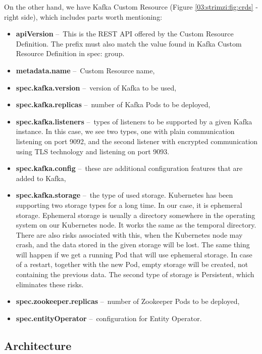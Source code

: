 On the other hand, we have Kafka Custom Resource (Figure \ref{03:strimzi:fig:crds} - right side), which includes parts worth mentioning:
\begin{itemize}[itemsep=1mm, parsep=0pt]
  \item \textbf{apiVersion} \---\ This is the REST API offered by the Custom Resource Definition. The prefix must also match the value found in Kafka Custom Resource Definition in spec: group. 
  \item \textbf{metadata.name} \---\ Custom Resource name,
  \item \textbf{spec.kafka.version} \---\ version of Kafka to be used,
  \item \textbf{spec.kafka.replicas} \---\ number of Kafka Pods to be deployed,
  \item \textbf{spec.kafka.listeners} \---\ types of listeners to be supported by a given Kafka instance. In this case, we see two types, one with plain communication listening on port 9092, and the second listener with encrypted communication using TLS technology and listening on port 9093.
  \item  \textbf{spec.kafka.config} \---\ these are additional configuration features that are added to Kafka,
  \item  \textbf{spec.kafka.storage} \cite{strimziStorageBlogPost} \---\ the type of used storage. Kubernetes has been supporting two storage types for a long time. In our case, it is ephemeral storage. Ephemeral storage is usually a directory somewhere in the operating system on our Kubernetes node. It works the same as the temporal directory. There are also risks associated with this, when the Kubernetes node may crash, and the data stored in the given storage will be lost. The same thing will happen if we get a running Pod that will use ephemeral storage. In case of a restart, together with the new Pod, empty storage will be created, not containing the previous data. The second type of storage is Persistent, which eliminates these risks.
  \item \textbf{spec.zookeeper.replicas} \---\ number of Zookeeper Pods to be deployed,
  \item \textbf{spec.entityOperator} \---\ configuration for Entity Operator.
\end{itemize}

\subsection{Architecture}

